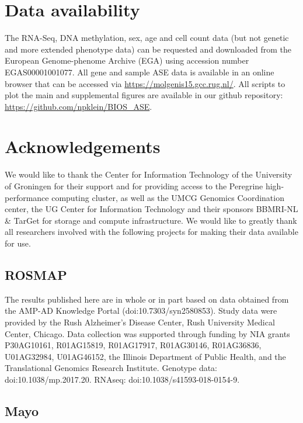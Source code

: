 \section*{Data availability}
The RNA-Seq, DNA methylation, sex, age and cell count data (but not genetic and more extended phenotype data) can be requested and downloaded from the European Genome-phenome Archive (EGA) using accession number EGAS00001001077. All gene and sample ASE data is available in an online browser that can be accessed via \url{https://molgenis15.gcc.rug.nl/}. All scripts to plot the main and supplemental figures are available in our github repository: \url{https://github.com/npklein/BIOS\_ASE}.

\section*{Acknowledgements}
We would like to thank the Center for Information Technology of the University of Groningen for their support and for providing access to the Peregrine high-performance computing cluster, as well as the UMCG Genomics Coordination center, the UG Center for Information Technology and their sponsors BBMRI-NL \& TarGet for storage and compute infrastructure. We would like to greatly thank all researchers involved with the following projects for making their data available for use. 

\subsection{ROSMAP}

The results published here are in whole or in part based on data obtained from the AMP-AD Knowledge Portal (doi:10.7303/syn2580853). Study data were provided by the Rush Alzheimer’s Disease Center, Rush University Medical Center, Chicago. Data collection was supported through funding by NIA grants P30AG10161, R01AG15819, R01AG17917, R01AG30146, R01AG36836, U01AG32984, U01AG46152, the Illinois Department of Public Health, and the Translational Genomics Research Institute. 
Genotype data: doi:10.1038/mp.2017.20. RNAseq: doi:10.1038/s41593-018-0154-9.  

\subsection{Mayo}

